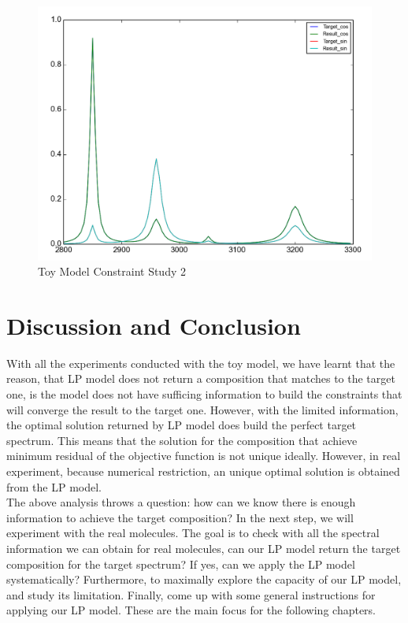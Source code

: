 \begin{figure}[!ht] \label{fig:3.6}
\centering
\includegraphics[scale=0.3]{Figures/toy_model_result_plotting_ir_sin_10candi_constraint_study_experiment5.png} 
\caption{Toy Model Constraint Study 2}
\end{figure}

\section{Discussion and Conclusion}
With all the experiments conducted with the toy model, we have learnt that the reason, that LP model does not return a composition that matches to the target one, is the model does not have sufficing information to build the constraints that will converge the result to the target one. However, with the limited information, the optimal solution returned by LP model does build the perfect target spectrum. This means that the solution for the composition that achieve minimum residual of the objective function is not unique ideally. However, in real experiment, because numerical restriction, an unique optimal solution is obtained from the LP model. \\

The above analysis throws a question: how can we know there is enough information to achieve the target composition? In the next step, we will experiment with the real molecules. The goal is to check with all the spectral information we can obtain for real molecules, can our LP model return the target composition for the target spectrum? If yes, can we apply the LP model systematically? Furthermore, to maximally explore the capacity of our LP model, and study its limitation. Finally, come up with some general instructions for applying our LP model. These are the main focus for the following chapters.\\

		

		 



